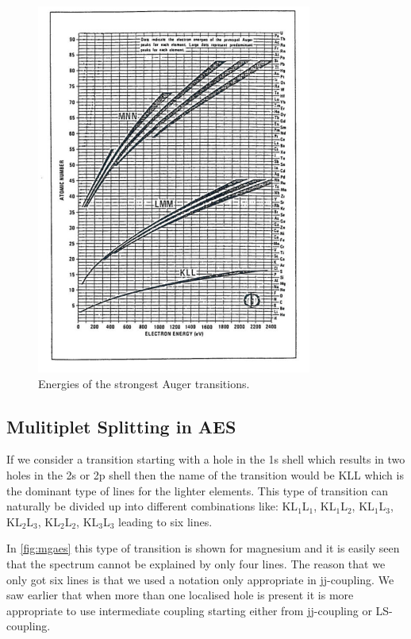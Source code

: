 \begin{figure}[h!]
	\begin{center}
	\includegraphics[scale=4.5]{figures/06_03.png}
	\caption{Energies of the strongest Auger transitions.}
	\label{fig:aestrans}
	\end{center}
\end{figure}

\subsection{Mulitiplet Splitting in AES}
If we consider a transition starting with  a hole in the 1s shell which results in two holes in the 2s or 2p shell then the name of the transition would be KLL which is the dominant type of lines for the lighter elements. This type of transition can naturally be divided up into different combinations like: KL$_1$L$_1$, KL$_1$L$_2$, KL$_1$L$_3$, KL$_2$L$_3$, KL$_2$L$_2$, KL$_3$L$_3$ leading to six lines.

In \autoref{fig:mgaes} this type of transition is shown for magnesium and it is easily seen that the spectrum cannot be explained by only four lines. The reason that we only got six lines is that we used a notation  only appropriate in jj-coupling. We saw earlier that when more than one localised hole is present it is more appropriate to use intermediate coupling starting either from jj-coupling or LS-coupling.

